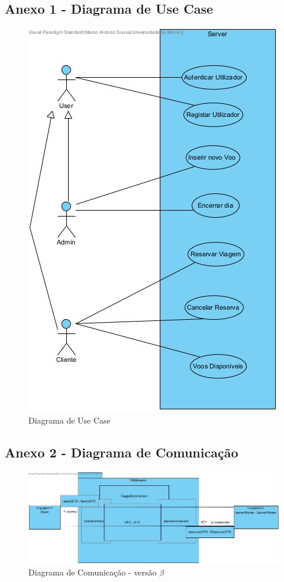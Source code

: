 \documentclass[a4paper,11pt]{article}
\begin{document}
\subsection{Anexo 1 - Diagrama de Use Case}
\begin{figure}[!ht]
    \centering
    \includegraphics[scale=0.75]{diagramas/useCaseDiagram.jpg}
    \caption{Diagrama de Use Case} \label{img:use_case}
\end{figure}

\begin{landscape}
    \subsection{Anexo 2 - Diagrama de Comunicação}
    \begin{figure}[!ht]
        \centering
        \includegraphics[width=\linewidth]{diagramas/MiddlewareCommunicationDiagram.jpg}
        \caption{Diagrama de Comunicação - versão $\beta$} \label{img:comunicacao}
    \end{figure}
\end{landscape}
\end{document}
